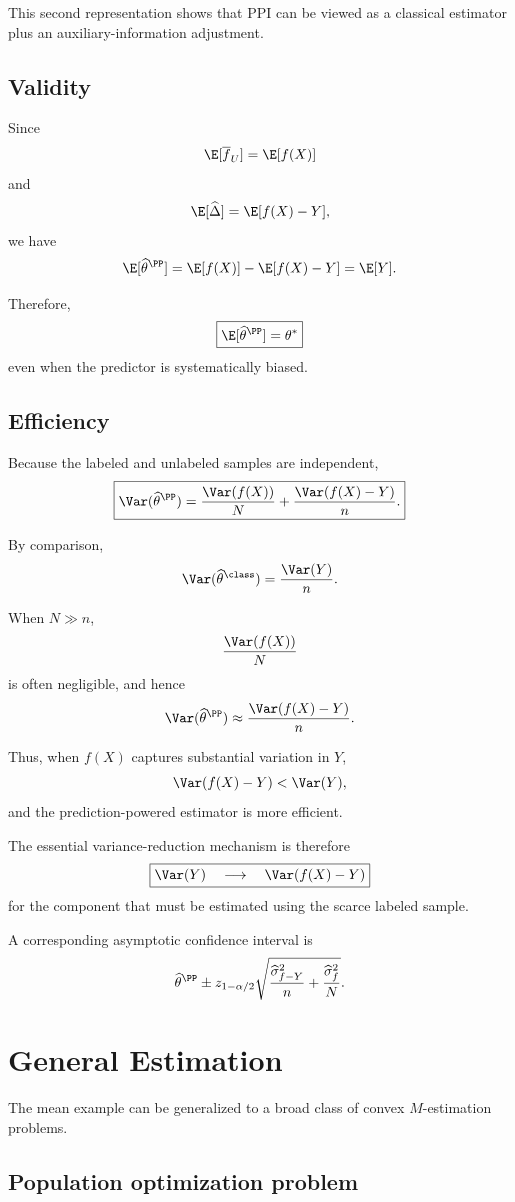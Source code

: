 This second representation shows that PPI can be viewed as a classical
estimator plus an auxiliary-information adjustment.

\subsection{Validity}

Since
\[
\E[\overline f_U]=\E[f(X)]
\]
and
\[
\E[\widehat{\Delta}]
=
\E[f(X)-Y],
\]
we have
\[
\E[\widehat{\theta}^{\PP}]
=
\E[f(X)]
-
\E[f(X)-Y]
=
\E[Y].
\]

Therefore,
\[
\boxed{
\E[\widehat{\theta}^{\PP}]=\theta^*
}
\]
even when the predictor is systematically biased.

\subsection{Efficiency}

Because the labeled and unlabeled samples are independent,
\[
\boxed{
\Var(\widehat{\theta}^{\PP})
=
\frac{\Var(f(X))}{N}
+
\frac{\Var(f(X)-Y)}{n}.
}
\]

By comparison,
\[
\Var(\widehat{\theta}^{\class})
=
\frac{\Var(Y)}{n}.
\]

When $N\gg n$,
\[
\frac{\Var(f(X))}{N}
\]
is often negligible, and hence
\[
\Var(\widehat{\theta}^{\PP})
\approx
\frac{\Var(f(X)-Y)}{n}.
\]

Thus, when $f(X)$ captures substantial variation in $Y$,
\[
\Var(f(X)-Y)
<
\Var(Y),
\]
and the prediction-powered estimator is more efficient.

The essential variance-reduction mechanism is therefore
\[
\boxed{
\Var(Y)
\quad\longrightarrow\quad
\Var(f(X)-Y)
}
\]
for the component that must be estimated using the scarce labeled sample.

A corresponding asymptotic confidence interval is
\[
\widehat{\theta}^{\PP}
\pm
z_{1-\alpha/2}
\sqrt{
\frac{\widehat{\sigma}_{f-Y}^2}{n}
+
\frac{\widehat{\sigma}_{f}^2}{N}
}.
\]

\section{General Estimation}

The mean example can be generalized to a broad class of convex
$M$-estimation problems.

\subsection{Population optimization problem}


